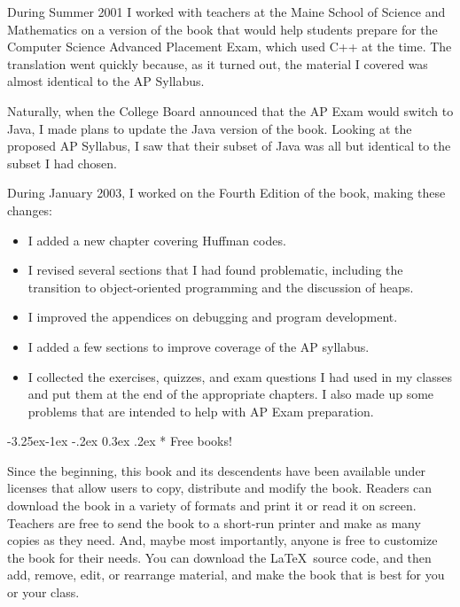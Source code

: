 \documentclass{book}
\makeatletter
\renewcommand\subsection{\@startsection {subsection}{2}{0mm}%
    {-3.25ex\@plus -1ex \@minus -.2ex}%
    {0.3ex \@plus .2ex}%
    {\normalfont\large\bfseries}}
\makeatother
\begin{document}
During Summer 2001 I worked with teachers at the Maine School of
Science and Mathematics on a version of the book that would help
students prepare for the Computer Science Advanced Placement Exam,
which used C++ at the time.  The translation went quickly because,
as it turned out, the material I covered was almost identical to
the AP Syllabus.

Naturally, when the College Board announced that the AP Exam
would switch to Java, I made plans to update the Java version of
the book.  Looking at the proposed AP Syllabus, I saw that their
subset of Java was all but identical to the subset I had chosen.

During January 2003, I worked on the Fourth Edition of the book,
making these changes:

\begin{itemize}

\item I added a new chapter covering Huffman codes.

\item I revised several sections that I had found problematic,
including the transition to object-oriented programming and the
discussion of heaps.

\item I improved the appendices on debugging and program development.

\item I added a few sections to improve coverage of the AP syllabus.

\item I collected the exercises, quizzes, and exam questions I
had used in my classes and put them at the end of the appropriate
chapters.  I also made up some problems that are intended to
help with AP Exam preparation.

\end{itemize}


\subsection* {Free books!}

Since the beginning, this book and its descendents have been available
under licenses that allow users to copy, distribute and modify the
book.  Readers can download the book in a variety of formats
and print it or read it on screen.  Teachers are free to send the book
to a short-run printer and make as many copies as they need.  And,
maybe most importantly, anyone is free to customize the book for their
needs.  You can download the \LaTeX\ source code, and then add,
remove, edit, or rearrange material, and make the book that is best
for you or your class.
\end{document}
